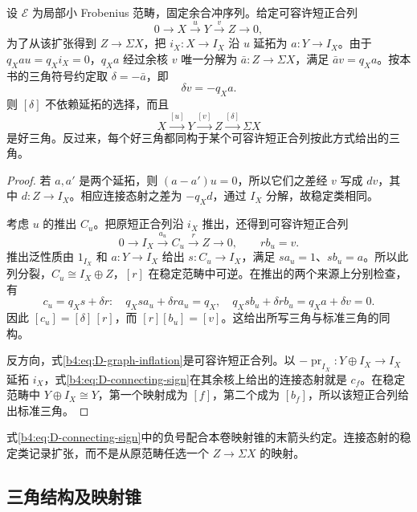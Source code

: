 \begin{proposition}\label{b4:prop:D-conflation-triangle}
	设 \(\mathcal E\) 为局部小 Frobenius 范畴，固定余合冲序列。给定可容许短正合列
	\[
		0\longrightarrow X\xrightarrow{u}Y\xrightarrow{v}Z\longrightarrow0,
	\]
	为了从该扩张得到 \(Z\to\Sigma X\)，把 \(i_X:X\to I_X\) 沿 \(u\) 延拓为 \(a:Y\to I_X\)。由于 \(q_Xau=q_Xi_X=0\)，\(q_Xa\) 经过余核 \(v\) 唯一分解为 \(\bar a:Z\to\Sigma X\)，满足 \(\bar a v=q_Xa\)。按本书的三角符号约定取 \(\delta=-\bar a\)，即
	\begin{equation}\label{b4:eq:D-connecting-sign}
		\delta v=-q_Xa.
	\end{equation}
	则 \([\delta]\) 不依赖延拓的选择，而且
	\[
		X\xrightarrow{[u]}Y\xrightarrow{[v]}Z\xrightarrow{[\delta]}\Sigma X
	\]
	是好三角。反过来，每个好三角都同构于某个可容许短正合列按此方式给出的三角。
\end{proposition}
\begin{proof}
	若 \(a,a'\) 是两个延拓，则 \((a-a')u=0\)，所以它们之差经 \(v\) 写成 \(dv\)，其中 \(d:Z\to I_X\)。相应连接态射之差为 \(-q_Xd\)，通过 \(I_X\) 分解，故稳定类相同。

	考虑 \(u\) 的推出 \(C_u\)。把原短正合列沿 \(i_X\) 推出，还得到可容许短正合列
	\[
		0\longrightarrow I_X\xrightarrow{a_u}C_u\xrightarrow{r}Z\longrightarrow0, \qquad rb_u=v.
	\]
	推出泛性质由 \(1_{I_X}\) 和 \(a:Y\to I_X\) 给出 \(s:C_u\to I_X\)，满足 \(sa_u=1\)、\(sb_u=a\)。所以此列分裂，\(C_u\cong I_X\oplus Z\)，\([r]\) 在稳定范畴中可逆。在推出的两个来源上分别检查，有
	\[
		c_u=q_Xs+\delta r: \quad q_Xsa_u+\delta ra_u=q_X, \quad q_Xsb_u+\delta rb_u=q_Xa+\delta v=0.
	\]
	因此 \([c_u]=[\delta]\,[r]\)，而 \([r][b_u]=[v]\)。这给出所写三角与标准三角的同构。

	反方向，式\eqref{b4:eq:D-graph-inflation}是可容许短正合列。以 \(-\operatorname{pr}_{I_X}:Y\oplus I_X\to I_X\) 延拓 \(i_X\)，式\eqref{b4:eq:D-connecting-sign}在其余核上给出的连接态射就是 \(c_f\)。在稳定范畴中 \(Y\oplus I_X\cong Y\)，第一个映射成为 \([f]\)，第二个成为 \([b_f]\)，所以该短正合列给出标准三角。
\end{proof}

式\eqref{b4:eq:D-connecting-sign}中的负号配合本卷映射锥的末箭头约定。连接态射的稳定类记录扩张，而不是从原范畴任选一个 \(Z\to\Sigma X\) 的映射。

\subsection{三角结构及映射锥}
\label{b4:subsec:D03:02}

